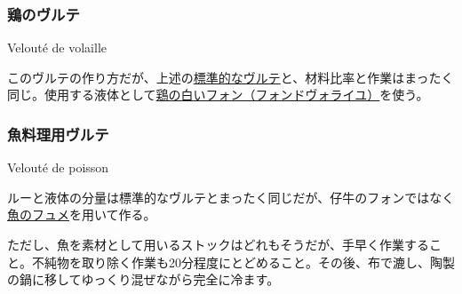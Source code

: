 \begin{recette}
\atoaki{}

\hypertarget{veloute-de-volaille}{%
\subsubsection{鶏のヴルテ}\label{veloute-de-volaille}}

\begin{frsubenv}

Velouté de volaille

\end{frsubenv}


このヴルテの作り方だが、上述の\protect\hyperlink{veloute}{標準的なヴルテ}と、材料比率と作業はまったく同じ。使用する液体として\protect\hyperlink{fonds-de-volaille}{鶏の白いフォン（フォンドヴォライユ）}を使う。

\atoaki{}

\hypertarget{veloute-de-poisson}{%
\subsubsection{魚料理用ヴルテ}\label{veloute-de-poisson}}

\begin{frsubenv}

Velouté de poisson

\end{frsubenv}


ルーと液体の分量は標準的なヴルテとまったく同じだが、仔牛のフォンではなく\protect\hyperlink{fumet-de-poisson}{魚のフュメ}を用いて作る。

ただし、魚を素材として用いるストックはどれもそうだが、手早く作業すること。不純物を取り除く作業も20分程度にとどめること。その後、布で漉し、陶製の鍋に移してゆっくり混ぜながら完全に冷ます。


\end{recette}

